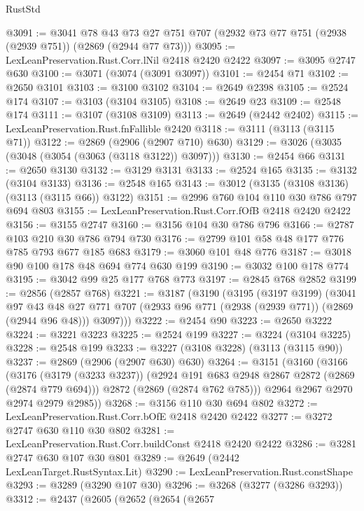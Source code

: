 \begin{lexlean}{RustStd}
\begin{coremodule}
@3091 := @3041
    @78
    @43
    @73
    @27
    @751
    @707
    (@2932 @73 @77 @751 (@2938 (@2939 @751)) (@2869 (@2944 @77 @73)))
@3095 := LexLeanPreservation.Rust.Corr.lNil @2418 @2420 @2422
@3097 := @3095 @2747 @630
@3100 := @3071 (@3074 (@3091 @3097))
@3101 := @2454 @71
@3102 := @2650 @3101
@3103 := @3100 @3102
@3104 := @2649 @2398
@3105 := @2524 @174
@3107 := @3103 (@3104 @3105)
@3108 := @2649 @23
@3109 := @2548 @174
@3111 := @3107 (@3108 @3109)
@3113 := @2649 (@2442 @2402)
@3115 := LexLeanPreservation.Rust.fnFallible @2420
@3118 := @3111 (@3113 (@3115 @71))
@3122 := @2869 (@2906 (@2907 @710) @630)
@3129 := @3026 (@3035 (@3048 (@3054 (@3063 (@3118 @3122)) @3097)))
@3130 := @2454 @66
@3131 := @2650 @3130
@3132 := @3129 @3131
@3133 := @2524 @165
@3135 := @3132 (@3104 @3133)
@3136 := @2548 @165
@3143 := @3012 (@3135 (@3108 @3136) (@3113 (@3115 @66)) @3122)
@3151 := @2996 @760 @104 @110 @30 @786 @797 @694 @803
@3155 := LexLeanPreservation.Rust.Corr.fOfB @2418 @2420 @2422
@3156 := @3155 @2747
@3160 := @3156 @104 @30 @786 @796
@3166 := @2787 @103 @210 @30 @786 @794 @730
@3176 := @2799 @101 @58 @48 @177 @776 @785 @793 @677 @185 @683
@3179 := @3060 @101 @48 @776
@3187 := @3018 @90 @100 @178 @48 @694 @774 @630 @199
@3190 := @3032 @100 @178 @774
@3195 := @3042 @99 @25 @177 @768 @773
@3197 := @2845 @768 @2852
@3199 := @2856 (@2857 @768)
@3221 := @3187
    (@3190
      (@3195
        (@3197 @3199)
        (@3041
          @97
          @43
          @48
          @27
          @771
          @707
          (@2933 @96 @771 (@2938 (@2939 @771)) (@2869 (@2944 @96 @48)))
          @3097)))
@3222 := @2454 @90
@3223 := @2650 @3222
@3224 := @3221 @3223
@3225 := @2524 @199
@3227 := @3224 (@3104 @3225)
@3228 := @2548 @199
@3233 := @3227 (@3108 @3228) (@3113 (@3115 @90))
@3237 := @2869 (@2906 (@2907 @630) @630)
@3264 := @3151
    (@3160
      (@3166
        (@3176
          (@3179 (@3233 @3237))
          (@2924 @191 @683 @2948 @2867 @2872 (@2869 (@2874 @779 @694)))
          @2872
          (@2869 (@2874 @762 @785)))
        @2964
        @2967
        @2970
        @2974
        @2979
        @2985))
@3268 := @3156 @110 @30 @694 @802
@3272 := LexLeanPreservation.Rust.Corr.bOfE @2418 @2420 @2422
@3277 := @3272 @2747 @630 @110 @30 @802
@3281 := LexLeanPreservation.Rust.Corr.buildConst @2418 @2420 @2422
@3286 := @3281 @2747 @630 @107 @30 @801
@3289 := @2649 (@2442 LexLeanTarget.RustSyntax.Lit)
@3290 := LexLeanPreservation.Rust.constShape
@3293 := @3289 (@3290 @107 @30)
@3296 := @3268 (@3277 (@3286 @3293))
@3312 := @2437
    (@2605
      (@2652
        (@2654
          (@2657

\end{coremodule}
\end{lexlean}
